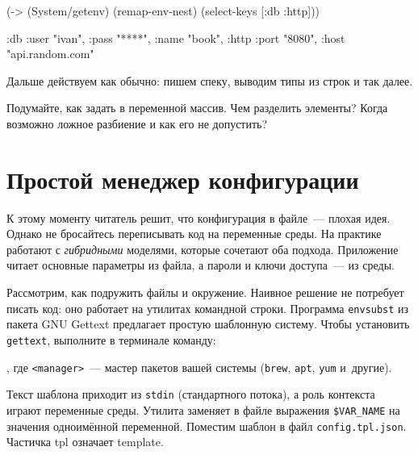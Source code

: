 \else

\begin{english}
  \begin{clojure}
(-> (System/getenv)
    (remap-env-nest)
    (select-keys [:db :http]))

{:db {:user "ivan", :pass "****", :name "book"},
 :http {:port "8080", :host "api.random.com"}}
  \end{clojure}
\end{english}

\fi

\noindent
Дальше действуем как обычно: пишем спеку, выводим типы из строк и так далее.

Подумайте, как задать в переменной массив. Чем разделить элементы? Когда
возможно ложное разбиение и как его не допустить?

\section{Простой менеджер конфигурации}


К этому моменту читатель решит, что конфигурация в файле~--- плохая идея. Однако
не бросайтесь переписывать код на переменные среды. На практике работают с
\emph{гибридными} моделями, которые сочетают оба подхода. Приложение читает
основные параметры из файла, а пароли и ключи доступа~--- из среды.


Рассмотрим, как подружить файлы и окружение. Наивное решение не потребует писать
код: оно работает на утилитах командной строки. Программа \verb|envsubst| из
пакета GNU Gettext предлагает простую шаблонную систему. Чтобы установить
\verb|gettext|, выполните в терминале команду:


\begin{english}
\end{english}

\noindent
, где \verb|<manager>|~--- мастер пакетов вашей системы (\verb|brew|,
\verb|apt|, \verb|yum| и~другие).


Текст шаблона приходит из \verb|stdin| (стандартного потока), а роль контекста
играют переменные среды. Утилита заменяет в файле выражения \verb|$VAR_NAME| на
значения одноимённой переменной. Поместим шаблон в файл
\verb|config.tpl.json|. Частичка tpl означает template.

